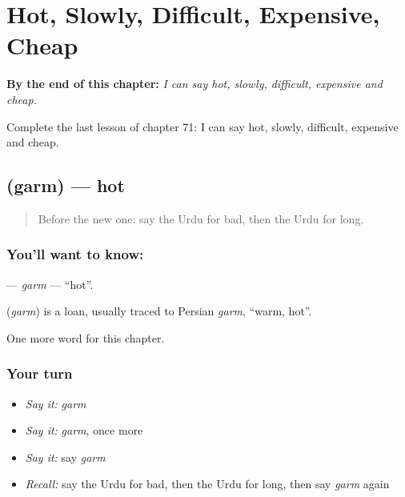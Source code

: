 
\chapter{Hot, Slowly, Difficult, Expensive, Cheap}
\label{ch:ur-hot-slowly-difficult-expensive-cheap}

\begin{chapteropening}
\textbf{By the end of this chapter:} \emph{I can say hot, slowly, difficult, expensive and cheap.}

Complete the last lesson of chapter 71: I can say hot, slowly, difficult, expensive and cheap.
\end{chapteropening}

\section[\texorpdfstring{\ur{گرم} (garm)}{گرم (garm)}]{ (garm) — hot}

\label{lesson:UR-C71-garm}



\begin{quote}
Before the new one: say the Urdu for bad, then the Urdu for long.
\end{quote}

\subsection*{You'll want to know: }
\textbf{} — \emph{garm} — \textquotedblleft{}hot\textquotedblright{}.

\begin{cousinweb}
\textbf{} (\emph{garm}) is a loan, usually traced to Persian \emph{garm}, \textquotedblleft{}warm, hot\textquotedblright{}.
\end{cousinweb}

\begin{grammarlens}[title={What you've built}]
One more word for this chapter.
\end{grammarlens}

\subsection*{Your turn}
\begin{itemize}
\raggedright
  \item \emph{Say it:} \emph{garm}
  \item \emph{Say it:} \emph{garm}, once more
  \item \emph{Say it:} say \emph{garm}
  \item \emph{Recall:} say the Urdu for bad, then the Urdu for long, then say \emph{garm} again
\end{itemize}

